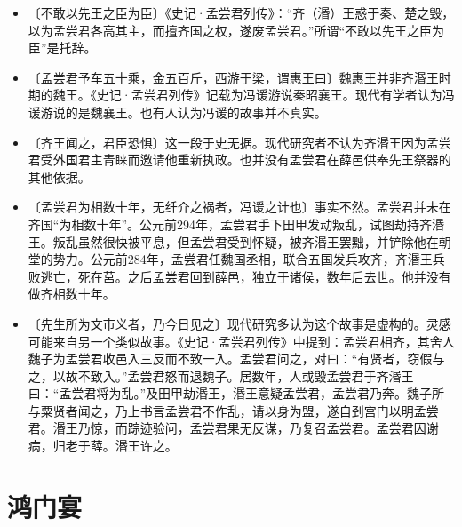 \documentclass[12pt,UTF-8,openany,a4]{ctexbook}
\begin{document}
\begin{itemize}
    \setlength\itemsep{-0.2em}
    \item〔不敢以先王之臣为臣〕{\yiwen 《史记·孟尝君列传》：“齐（湣）王惑于秦、楚之毁，以为孟尝君各高其主，而擅齐国之权，遂废孟尝君。”所谓“不敢以先王之臣为臣”是托辞。}
    \item〔孟尝君予车五十乘，金五百斤，西游于梁，谓惠王曰〕{\yiwen 魏惠王并非齐湣王时期的魏王。《史记·孟尝君列传》记载为冯谖游说秦昭襄王。现代有学者认为冯谖游说的是魏襄王。也有人认为冯谖的故事并不真实。}
    \item〔齐王闻之，君臣恐惧〕{\yiwen 这一段于史无据。现代研究者不认为齐湣王因为孟尝君受外国君主青睐而邀请他重新执政。也并没有孟尝君在薛邑供奉先王祭器的其他依据。}
    \item〔孟尝君为相数十年，无纤介之祸者，冯谖之计也〕{\yiwen 事实不然。孟尝君并未在齐国“为相数十年”。公元前294年，孟尝君手下田甲发动叛乱，试图劫持齐湣王。叛乱虽然很快被平息，但孟尝君受到怀疑，被齐湣王罢黜，并铲除他在朝堂的势力。公元前284年，孟尝君任魏国丞相，联合五国发兵攻齐，齐湣王兵败逃亡，死在莒。之后孟尝君回到薛邑，独立于诸侯，数年后去世。他并没有做齐相数十年。}
    \item〔先生所为文市义者，乃今日见之〕{\yiwen 现代研究多认为这个故事是虚构的。灵感可能来自另一个类似故事。《史记·孟尝君列传》中提到：孟尝君相齐，其舍人魏子为孟尝君收邑入三反而不致一入。孟尝君问之，对曰：“有贤者，窃假与之，以故不致入。”孟尝君怒而退魏子。居数年，人或毁孟尝君于齐湣王曰：“孟尝君将为乱。”及田甲劫湣王，湣王意疑孟尝君，孟尝君乃奔。魏子所与粟贤者闻之，乃上书言孟尝君不作乱，请以身为盟，遂自刭宫门以明孟尝君。湣王乃惊，而踪迹验问，孟尝君果无反谋，乃复召孟尝君。孟尝君因谢病，归老于薛。湣王许之。}
\end{itemize}

\chapter{鸿门宴}
\end{document}
